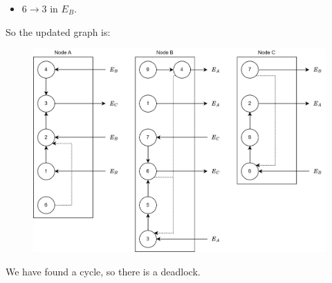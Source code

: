 \begin{itemize}
    \item $6 \rightarrow 3$ in $E_B$. 
\end{itemize}
So the updated graph is: 
\begin{figure}[H]
    \centering
    \includegraphics[width=0.75\linewidth]{images/Ob3.png}
\end{figure}
We have found a cycle, so there is a deadlock. 
